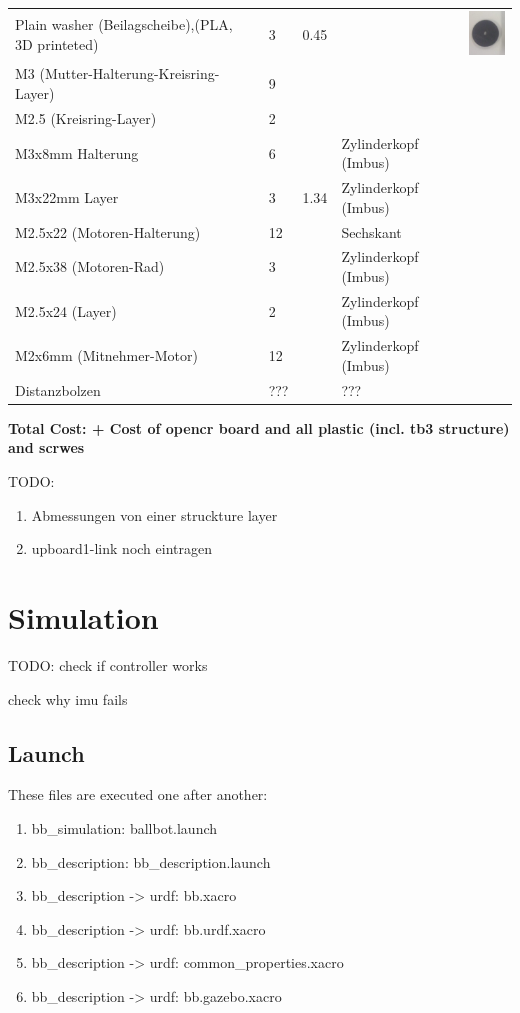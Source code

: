 \documentclass[twoside,colorback,accentcolor=tud4c,11pt]{tudreport}
\begin{document}
\begin{tabular}{l l l l l}
	Plain washer (Beilagscheibe),(PLA, 3D printeted)&3&0.45 & &
	\includegraphics[height=0.06\textwidth]{img/beilagscheibe.png}  \\
	
	M3  (Mutter-Halterung-Kreisring-Layer)&9& & & \\
	M2.5  (Kreisring-Layer)&2& & & \\
	M3x8mm Halterung &6& &Zylinderkopf (Imbus) & \\
	M3x22mm Layer&3&1.34 &Zylinderkopf (Imbus) & \\
	M2.5x22 (Motoren-Halterung) &12&&Sechskant & \\
	M2.5x38 (Motoren-Rad)&3& &Zylinderkopf (Imbus) & \\
	M2.5x24 (Layer)&2& &Zylinderkopf (Imbus) & \\
	M2x6mm  (Mitnehmer-Motor)&12 & &Zylinderkopf (Imbus) & \\
	Distanzbolzen&???& &???& \\
	
\end{tabular}

\textbf{Total Cost:  + Cost of opencr board and all plastic (incl. tb3 structure) and scrwes }

TODO:\\
\begin{enumerate}
	\item Abmessungen von einer struckture layer
	\item upboard1-link noch eintragen
\end{enumerate}

\chapter{Simulation}

TODO: 
check if controller works

check why imu fails

\section{Launch}
These files are executed one after another:
\begin{enumerate}
	\item bb\_simulation: ballbot.launch
	\item bb\_description: bb\_description.launch
	\item bb\_description -> urdf: bb.xacro
	\item bb\_description -> urdf: bb.urdf.xacro
	\item bb\_description -> urdf: common\_properties.xacro
	\item bb\_description -> urdf: bb.gazebo.xacro
\end{enumerate}
\end{document}
